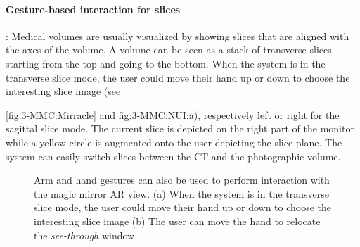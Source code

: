 {{{{\paragraph{Gesture-based interaction for slices}: Medical volumes are usually visualized by showing slices that are aligned with the axes of the volume. A volume can be seen as a stack of transverse slices starting from the top and going to the bottom. When the system is in the transverse slice mode, the user could move their hand up or down to choose the interesting slice image (see \figurename{\ref{fig:3-MMC:Mirracle} and \figurename{fig:3-MMC:NUI:a}), respectively left or right for the sagittal slice mode. The current slice is depicted on the right part of the monitor while a yellow circle is augmented onto the user depicting the slice plane. The system can easily switch slices between the CT and the photographic volume.
\begin{figure}
	\centering
	\caption[Natural User interaction]{Arm and hand gestures can also be used to perform interaction with the magic mirror AR view. (a) When the system is in the transverse slice mode, the user could move their hand up or down to choose the interesting slice image (b) The user can move the hand to relocate the \textit{see-through} window.}
	\label{fig:3-MMC:NUI}
\end{figure}
}}}}}
